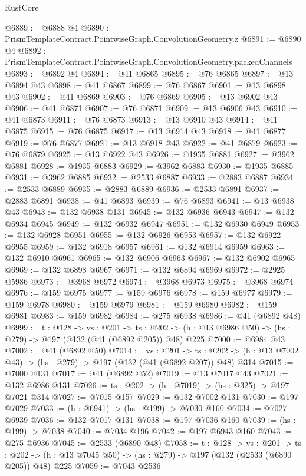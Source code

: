 \begin{lexlean}{RustCore}
\begin{coremodule}
@6889 := @6888 @4
@6890 := PrismTemplateContract.PointwiseGraph.ConvolutionGeometry.z
@6891 := @6890 @4
@6892 := PrismTemplateContract.PointwiseGraph.ConvolutionGeometry.packedChannels
@6893 := @6892 @4
@6894 := @41 @6865
@6895 := @76 @6865
@6897 := @13 @6894 @43
@6898 := @41 @6867
@6899 := @76 @6867
@6901 := @13 @6898 @43
@6902 := @41 @6869
@6903 := @76 @6869
@6905 := @13 @6902 @43
@6906 := @41 @6871
@6907 := @76 @6871
@6909 := @13 @6906 @43
@6910 := @41 @6873
@6911 := @76 @6873
@6913 := @13 @6910 @43
@6914 := @41 @6875
@6915 := @76 @6875
@6917 := @13 @6914 @43
@6918 := @41 @6877
@6919 := @76 @6877
@6921 := @13 @6918 @43
@6922 := @41 @6879
@6923 := @76 @6879
@6925 := @13 @6922 @43
@6926 := @1935 @6881
@6927 := @3962 @6881
@6928 := @1935 @6883
@6929 := @3962 @6883
@6930 := @1935 @6885
@6931 := @3962 @6885
@6932 := @2533 @6887
@6933 := @2883 @6887
@6934 := @2533 @6889
@6935 := @2883 @6889
@6936 := @2533 @6891
@6937 := @2883 @6891
@6938 := @41 @6893
@6939 := @76 @6893
@6941 := @13 @6938 @43
@6943 := @132 @6938 @131
@6945 := @132 @6936 @6943
@6947 := @132 @6934 @6945
@6949 := @132 @6932 @6947
@6951 := @132 @6930 @6949
@6953 := @132 @6928 @6951
@6955 := @132 @6926 @6953
@6957 := @132 @6922 @6955
@6959 := @132 @6918 @6957
@6961 := @132 @6914 @6959
@6963 := @132 @6910 @6961
@6965 := @132 @6906 @6963
@6967 := @132 @6902 @6965
@6969 := @132 @6898 @6967
@6971 := @132 @6894 @6969
@6972 := @2925 @5986
@6973 := @3968 @6972
@6974 := @3968 @6973
@6975 := @3968 @6974
@6976 := @159 @6975
@6977 := @159 @6976
@6978 := @159 @6977
@6979 := @159 @6978
@6980 := @159 @6979
@6981 := @159 @6980
@6982 := @159 @6981
@6983 := @159 @6982
@6984 := @275 @6938
@6986 := @41 (@6892 @48)
@6999 := {t : @128} ->
  {vs : @201} ->
  {ts : @202} -> (h : @13 @6986 @50) -> (hs : @279) -> @197 (@132 (@41 (@6892 @205)) @48) @225
@7000 := @6984 @43
@7002 := @41 (@6892 @50)
@7014 := {vs : @201} ->
  {ts : @202} -> (h : @13 @7002 @43) -> (hs : @279) -> @197 (@132 (@41 (@6892 @207)) @48) @314
@7015 := @7000 @131
@7017 := @41 (@6892 @52)
@7019 := @13 @7017 @43
@7021 := @132 @6986 @131
@7026 := {ts : @202} -> (h : @7019) -> (hs : @325) -> @197 @7021 @314
@7027 := @7015 @157
@7029 := @132 @7002 @131
@7030 := @197 @7029
@7033 := (h : @6941) -> (hs : @199) -> @7030 @160
@7034 := @7027 @6939
@7036 := @132 @7017 @131
@7038 := @197 @7036 @160
@7039 := (hs : @199) -> @7038
@7040 := @7034 @196
@7042 := @197 @6943 @160
@7043 := @275 @6936
@7045 := @2533 (@6890 @48)
@7058 := {t : @128} ->
  {vs : @201} ->
  {ts : @202} -> (h : @13 @7045 @50) -> (hs : @279) -> @197 (@132 (@2533 (@6890 @205)) @48) @225
@7059 := @7043 @2536

\end{coremodule}
\end{lexlean}
